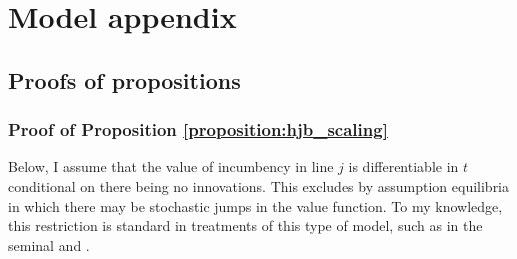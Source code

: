 \documentclass[11pt,english]{article}
\theoremstyle{definition}
\begin{document}
\section{Model appendix}\label{appendix:model}

\subsection{Proofs of propositions}

\subsubsection{Proof of Proposition \ref{proposition:hjb_scaling}}\label{appendix:proofs:proposition:hjb_scaling}

Below, I assume that the value of incumbency in line $j$ is differentiable in $t$ conditional on there being no innovations. This excludes by assumption equilibria in which there may be stochastic jumps in the value function. To my knowledge, this restriction is standard in treatments of this type of model, such as in the seminal \cite{grossman_quality_1991} and \cite{acemoglu_introduction_2009}.
\end{document}
